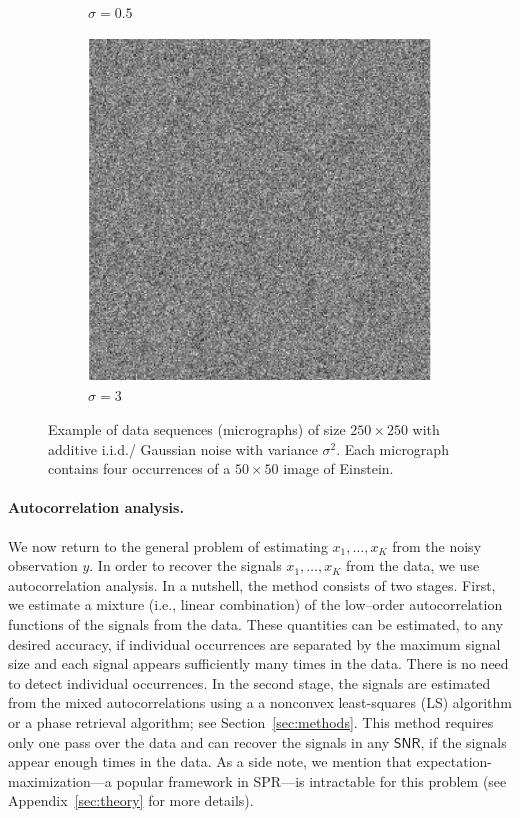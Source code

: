 \documentclass[english,11pt]{article}
\numberwithin{equation}{section}
\theoremstyle{plain}
\theoremstyle{definition}
\theoremstyle{remark}
\theoremstyle{plain}
\theoremstyle{remark}
\theoremstyle{plain}
\theoremstyle{plain}
\newcommand{\SNR}{{\textsf{SNR}}}
\begin{document}
\begin{figure}[h!]
\begin{subfigure}[h]{0.33\textwidth}
		\caption{$\sigma = 0.5$}
	\end{subfigure}
	\begin{subfigure}[h]{0.33\textwidth}
		\centering
		\includegraphics[scale=0.5]{micrograph_Einstein_example_s3}
		\caption{$\sigma = 3$}
	\end{subfigure}
	\caption{\label{fig:micro_example} Example of data sequences (micrographs) of size $250\times 250$ with additive i.i.d./ Gaussian noise with variance $\sigma^2$. Each micrograph contains four occurrences of a $50 \times 50$ image of Einstein.}	
\end{figure}


\paragraph{Autocorrelation analysis.}
We now return to the general problem of estimating $x_1,\dots,x_K$ from the noisy observation $y$.
In order to recover the signals $x_1,\dots,x_K$ from the data, we use autocorrelation analysis.
In a nutshell, the method consists of two stages. First, we estimate a mixture (i.e., linear combination) of the low--order autocorrelation functions of the signals from the data. These quantities can be estimated, to any desired accuracy, if individual occurrences are separated by the maximum signal size and each signal appears sufficiently many times in the data. There is no need to detect individual occurrences.
In the second stage, the signals are estimated from the mixed autocorrelations using a a nonconvex least-squares (LS) algorithm or a phase retrieval algorithm; see Section~\ref{sec:methods}.
This method requires only one pass over the data and can recover the signals in any $\SNR$, if the signals appear enough times in the data. As a side note, we mention that expectation-maximization---a popular framework in SPR---is intractable for this problem (see Appendix~\ref{sec:theory}  for more details). 
\end{document}
